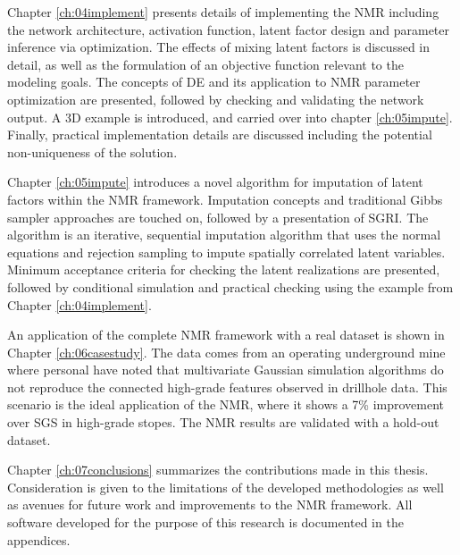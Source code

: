 Chapter \ref{ch:04implement} presents details of implementing the \gls{NMR} including the network architecture, activation function, latent factor design and parameter inference via optimization. The effects of mixing latent factors is discussed in detail, as well as the formulation of an objective function relevant to the modeling goals. The concepts of \acrfull{DE} and its application to \gls{NMR} parameter optimization are presented, followed by checking and validating the network output. A \gls{3D} example is introduced, and carried over into chapter \ref{ch:05impute}. Finally, practical implementation details are discussed including the potential non-uniqueness of the solution.

Chapter \ref{ch:05impute} introduces a novel algorithm for imputation of latent factors within the \gls{NMR} framework. Imputation concepts and traditional Gibbs sampler approaches are touched on, followed by a presentation of \acrfull{SGRI}. The algorithm is an iterative, sequential imputation algorithm that uses the normal equations and rejection sampling to impute spatially correlated latent variables. Minimum acceptance criteria for checking the latent realizations are presented, followed by conditional simulation and practical checking using the example from Chapter \ref{ch:04implement}.

An application of the complete \gls{NMR} framework with a real dataset is shown in Chapter \ref{ch:06casestudy}. The data comes from an operating underground mine where personal have noted that multivariate Gaussian simulation algorithms do not reproduce the connected high-grade features observed in drillhole data. This scenario is the ideal application of the \gls{NMR}, where it shows a 7\% improvement over \gls{SGS} in high-grade stopes. The \gls{NMR} results are validated with a hold-out dataset.

Chapter \ref{ch:07conclusions} summarizes the contributions made in this thesis. Consideration is given to the limitations of the developed methodologies as well as avenues for future work and improvements to the \gls{NMR} framework. All software developed for the purpose of this research is documented in the appendices.